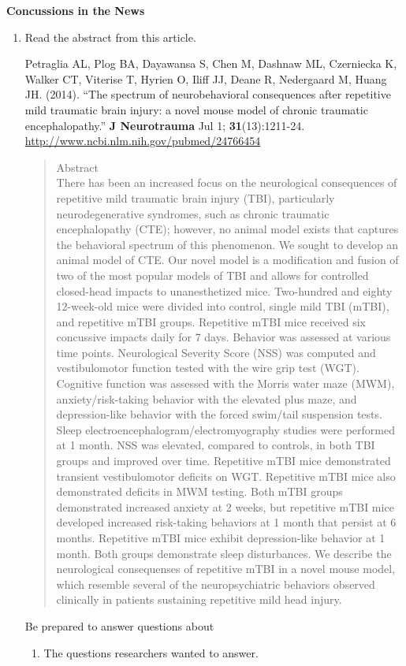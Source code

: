 \def\theTopic{Reading 23 }

\begin{center}
{\bf {\large Concussions in the News}}\\
\end{center}


\begin{enumerate}
\item   Read the abstract from this  article.

Petraglia AL, Plog BA, Dayawansa S, Chen M, Dashnaw ML, Czerniecka K,
Walker CT, Viterise T, Hyrien O, Iliff JJ, Deane R, Nedergaard M,
Huang JH. (2014). ``The spectrum of neurobehavioral consequences after repetitive mild traumatic brain injury: a novel mouse model of chronic traumatic encephalopathy.''
{\bf J Neurotrauma} Jul 1; {\bf 31}(13):1211-24. 
\url{http://www.ncbi.nlm.nih.gov/pubmed/24766454}
{\footnotesize
\begin{quotation}
Abstract\\
There has been an increased focus on the neurological consequences of
repetitive mild traumatic brain injury (TBI), particularly
neurodegenerative syndromes, such as chronic traumatic encephalopathy
(CTE); however, no animal model exists that captures the behavioral
spectrum of this phenomenon. We sought to develop an animal model of
CTE. Our novel model is a modification and fusion of two of the most
popular models of TBI and allows for controlled closed-head impacts to
unanesthetized mice. Two-hundred and eighty 12-week-old mice were
divided into control, single mild TBI (mTBI), and repetitive mTBI
groups. Repetitive mTBI mice received six concussive impacts daily for
7 days. Behavior was assessed at various time points. Neurological
Severity Score (NSS) was computed and vestibulomotor function tested
with the wire grip test (WGT). Cognitive function was assessed with
the Morris water maze (MWM), anxiety/risk-taking behavior with the
elevated plus maze, and depression-like behavior with the forced
swim/tail suspension tests. Sleep
electroencephalogram/electromyography studies were performed at 1
month. NSS was elevated, compared to controls, in both TBI groups and
improved over time. Repetitive mTBI mice demonstrated transient
vestibulomotor deficits on WGT. Repetitive mTBI mice also demonstrated
deficits in MWM testing. Both mTBI groups demonstrated increased
anxiety at 2 weeks, but repetitive mTBI mice developed increased
risk-taking behaviors at 1 month that persist at 6 months. Repetitive
mTBI mice exhibit depression-like behavior at 1 month. Both groups
demonstrate sleep disturbances. We describe the neurological consequenses
of repetitive mTBI in a novel mouse model, which resemble several of
the neuropsychiatric behaviors observed clinically in patients
sustaining repetitive mild head injury.
\end{quotation}
}
 Be prepared to answer questions about 
\begin{enumerate}
\item  The questions researchers wanted to answer.
\begin{students}
 \vspace{1in}
\end{students}


\end{enumerate}
\end{enumerate}
